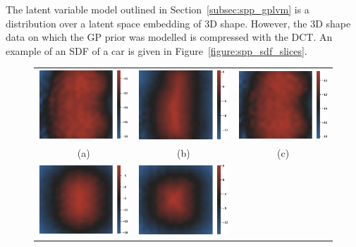 The latent variable model outlined in Section~\ref{subsec:spp_gplvm} is a distribution 
over a latent space embedding of 3D shape. However, the 3D shape data on which the GP 
prior was modelled is compressed with the DCT\@. An example of an SDF of a car is given 
in Figure~\ref{figure:spp_sdf_slices}.
\begin{figure}[!htbp]
  \centering
  \begin{tabular}{ccc}
    \includegraphics[width=.3\linewidth]{figures/spp/car_sdf_slices/x_0.eps}&
		\includegraphics[width=.3\linewidth]{figures/spp/car_sdf_slices/x_10.eps}&
		\includegraphics[width=.3\linewidth]{figures/spp/car_sdf_slices/x_19.eps}\\
    (a) & (b) & (c) \\
    \includegraphics[width=.3\linewidth]{figures/spp/car_sdf_slices/y_0.eps}&
		\includegraphics[width=.3\linewidth]{figures/spp/car_sdf_slices/y_10.eps}&

\end{tabular}
\end{figure}
